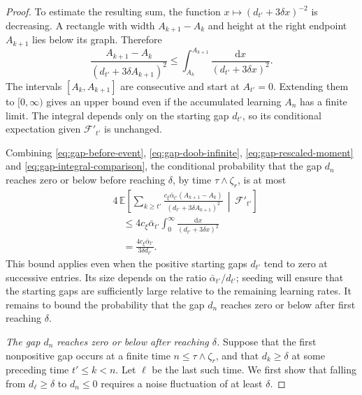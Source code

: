 \begin{proof}
To estimate the resulting sum, the function $x\mapsto(d_{t'}+3\delta x)^{-2}$ is decreasing. A rectangle with width $A_{k+1}-A_k$ and height at the right endpoint $A_{k+1}$ lies below its graph. Therefore
\begin{equation}
\frac{A_{k+1}-A_k}{(d_{t'}+3\delta A_{k+1})^2}
\le
\int_{A_k}^{A_{k+1}}\frac{\mathrm dx}{(d_{t'}+3\delta x)^2}.
\label{eq:gap-integral-comparison}
\end{equation}
The intervals $[A_k,A_{k+1}]$ are consecutive and start at $A_{t'}=0$. Extending them to $[0,\infty)$ gives an upper bound even if the accumulated learning $A_n$ has a finite limit. The integral depends only on the starting gap $d_{t'}$, so its conditional expectation given $\mathcal F'_{t'}$ is unchanged.

Combining \eqref{eq:gap-before-event}, \eqref{eq:gap-doob-infinite}, \eqref{eq:gap-rescaled-moment} and \eqref{eq:gap-integral-comparison}, the conditional probability that the gap $d_n$ reaches zero or below before reaching $\delta$, by time $\tau\wedge\zeta_r$, is at most
\begin{equation}
\begin{aligned}
&4\,\mathbb E\!\left[
\sum_{k\ge t'}
\frac{c_\xi\bar\alpha_{t'}(A_{k+1}-A_k)}
{(d_{t'}+3\delta A_{k+1})^2}
\,\middle|\,\mathcal F'_{t'}\right]\\
&\quad\le
4c_\xi\bar\alpha_{t'}\int_0^\infty
\frac{\mathrm dx}{(d_{t'}+3\delta x)^2}\\
&\quad=\frac{4c_\xi\bar\alpha_{t'}}{3\delta d_{t'}}.
\end{aligned}
\label{eq:gap-before-bound}
\end{equation}
This bound applies even when the positive starting gaps $d_{t'}$ tend to zero at successive entries. Its size depends on the ratio $\bar\alpha_{t'}/d_{t'}$; seeding will ensure that the starting gaps are sufficiently large relative to the remaining learning rates. It remains to bound the probability that the gap $d_n$ reaches zero or below after first reaching $\delta$.

\emph{The gap $d_n$ reaches zero or below after reaching $\delta$.}
Suppose that the first nonpositive gap occurs at a finite time $n\le\tau\wedge\zeta_r$, and that $d_k\ge\delta$ at some preceding time $t'\le k<n$. Let $\ell$ be the last such time. We first show that falling from $d_\ell\ge\delta$ to $d_n\le0$ requires a noise fluctuation of at least $\delta$.


\end{proof}
